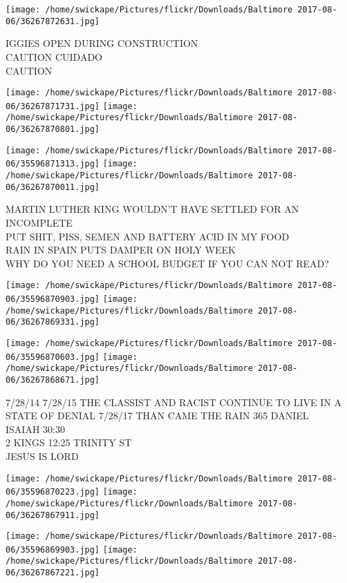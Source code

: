 \documentclass[10pt,letterpaper]{article}
\begin{document}
\vspace{0.25in}
\texttt{[image: /home/swickape/Pictures/flickr/Downloads/Baltimore 2017-08-06/36267872631.jpg]}

IGGIES OPEN DURING CONSTRUCTION\\
CAUTION CUIDADO\\
CAUTION\\
\pagebreak

\texttt{[image: /home/swickape/Pictures/flickr/Downloads/Baltimore 2017-08-06/36267871731.jpg]}
\texttt{[image: /home/swickape/Pictures/flickr/Downloads/Baltimore 2017-08-06/36267870801.jpg]}

\texttt{[image: /home/swickape/Pictures/flickr/Downloads/Baltimore 2017-08-06/35596871313.jpg]}
\texttt{[image: /home/swickape/Pictures/flickr/Downloads/Baltimore 2017-08-06/36267870011.jpg]}

MARTIN LUTHER KING WOULDN'T HAVE SETTLED FOR AN INCOMPLETE\\
PUT SHIT, PISS, SEMEN AND BATTERY ACID IN MY FOOD\\
RAIN IN SPAIN PUTS DAMPER ON HOLY WEEK\\
WHY DO YOU NEED A SCHOOL BUDGET IF YOU CAN NOT READ?\\
\pagebreak

\texttt{[image: /home/swickape/Pictures/flickr/Downloads/Baltimore 2017-08-06/35596870903.jpg]}
\texttt{[image: /home/swickape/Pictures/flickr/Downloads/Baltimore 2017-08-06/36267869331.jpg]}

\texttt{[image: /home/swickape/Pictures/flickr/Downloads/Baltimore 2017-08-06/35596870603.jpg]}
\texttt{[image: /home/swickape/Pictures/flickr/Downloads/Baltimore 2017-08-06/36267868671.jpg]}

7/28/14 7/28/15 THE CLASSIST AND RACIST CONTINUE TO LIVE IN A STATE OF DENIAL 7/28/17 THAN CAME THE RAIN 365 DANIEL\\
ISAIAH 30:30\\
2 KINGS 12:25 TRINITY ST\\
JESUS IS LORD\\
\pagebreak

\texttt{[image: /home/swickape/Pictures/flickr/Downloads/Baltimore 2017-08-06/35596870223.jpg]}
\texttt{[image: /home/swickape/Pictures/flickr/Downloads/Baltimore 2017-08-06/36267867911.jpg]}

\texttt{[image: /home/swickape/Pictures/flickr/Downloads/Baltimore 2017-08-06/35596869903.jpg]}
\texttt{[image: /home/swickape/Pictures/flickr/Downloads/Baltimore 2017-08-06/36267867221.jpg]}
\end{document}
